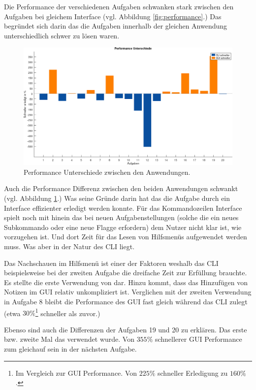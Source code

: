 \documentclass[oneside,bibliography=totocnumbered,BCOR=5mm]{scrbook}
\begin{document}
Die Performance der verschiedenen Aufgaben schwanken stark zwischen den Aufgaben
bei gleichem Interface (vgl. Abbildung \ref{fig:performance}.) Das begründet
sich darin das die Aufgaben innerhalb der gleichen Anwendung unterschiedlich
schwer zu lösen waren.

\medskip

\begin{figure}[H]
  \centering
  \includegraphics[scale=0.36]{performance-diff.png}
  \caption{Performance Unterschiede zwischen den Anwendungen.}
  \label{fig:performance-diff}
\end{figure}

Auch die Performance Differenz zwischen den beiden Anwendungen schwankt
(vgl. Abbildung \ref{fig:performance-diff}.) Was seine Gründe darin hat das
die Aufgabe durch ein Interface effizienter erledigt werden konnte. Für das
Kommandozeilen Interface spielt noch mit hinein das bei neuen Aufgabenstellungen
(solche die ein neues Subkommando oder eine neue Flagge erfordern) dem Nutzer
nicht klar ist, wie vorzugehen ist. Und dort Zeit für das Lesen von Hilfsmenüs
aufgewendet werden muss. Was aber in der Natur des CLI liegt.

Das Nachschauen im Hilfsmenü ist einer der Faktoren weshalb das CLI
beispielsweise bei der zweiten Aufgabe die dreifache Zeit zur Erfüllung
brauchte. Es stellte die erste Verwendung von  dar. Hinzu
kommt, dass das Hinzufügen von Notizen im GUI relativ unkompliziert ist.
Verglichen mit der zweiten Verwendung in Aufgabe 8 bleibt die Performance des
GUI fast gleich während das CLI zulegt (etwa $30\%$\footnote{Im Vergleich zur
GUI Performance. Von $225\%$ schneller Erledigung zu $160\%$.} schneller als
zuvor.)

Ebenso sind auch die Differenzen der Aufgaben 19 und 20 zu erklären. Das
erste bzw. zweite Mal das  verwendet wurde. Von $355\%$
schnellerer GUI Performance zum gleichauf sein in der nächsten Aufgabe.
\end{document}
